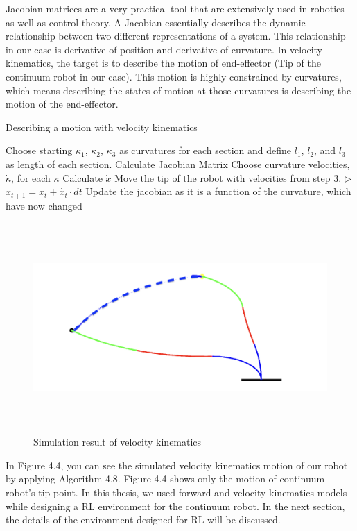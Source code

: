 \documentclass[12pt,twoside,a4]{mwbk}
\begin{document}
Jacobian matrices are a very practical tool that are extensively used in robotics as well as control theory. A Jacobian essentially describes the dynamic relationship between two different representations of a system. This relationship in our case is derivative of position and derivative of curvature. In velocity kinematics, the target is to describe the motion of end-effector (Tip of the continuum robot in our case). This motion is highly constrained by curvatures, which means describing the states of motion at those curvatures is describing the motion of the end-effector.
\newpage
\begin{algorithm}
\caption{Describing a motion with velocity kinematics}
\begin{algorithmic}[1]
\State Choose starting $\kappa_1$, $\kappa_2$, $\kappa_3$ as curvatures for each section and define $l_1$, $l_2$, and $l_3$ as length of each section.
\State Calculate Jacobian Matrix
\State Choose curvature velocities,$\dot{\kappa}$, for each $\kappa$
\State Calculate $\dot{x}$
\State Move the tip of the robot with velocities from step 3. $\triangleright$ $x_{t+1} = x_t + \dot{x_t}\cdot dt$
\State Update the jacobian as it is a function of the curvature, which have now changed
\EndWhile
\end{algorithmic}
\end{algorithm}

\begin{figure}[h]
    \centering
    \includegraphics[width=16.0cm, height=8.0cm]{velocity_kin.png}
    \caption{Simulation result of velocity kinematics}
\end{figure}

\noindent In Figure 4.4, you can see the simulated velocity kinematics motion of our robot by applying Algorithm 4.8. Figure 4.4 shows only the motion of continuum robot's tip point. In this thesis, we used forward and velocity kinematics models while designing a RL environment for the continuum robot. In the next section, the details of the environment designed for RL will be discussed.
\end{document}
